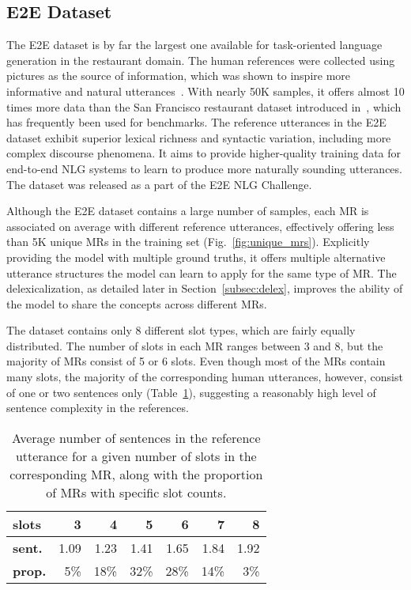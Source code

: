 \documentclass[11pt,a4paper]{article}
\begin{document}
\subsection{E2E Dataset}

The E2E dataset is by far the largest one available for task-oriented language generation in the restaurant domain. The human references were collected using pictures as the source of information, which was shown to inspire more informative and natural utterances~\cite{novikova2016crowd}. With nearly 50K samples, it offers almost 10 times more data than the San Francisco restaurant dataset introduced in~\citet{wen2015semantically}, which has frequently been used for benchmarks. The reference utterances in the E2E dataset exhibit superior lexical richness and syntactic variation, including more complex discourse phenomena. It aims to provide higher-quality training data for end-to-end NLG systems to learn to produce more naturally sounding utterances. The dataset was released as a part of the E2E NLG Challenge.

Although the E2E dataset contains a large number of samples, each MR is associated on average with  different reference utterances, effectively offering less than 5K unique MRs in the training set (Fig.~\ref{fig:unique_mrs}). Explicitly providing the model with multiple ground truths, it offers multiple alternative utterance structures the model can learn to apply for the same type of MR. The delexicalization, as detailed later in Section~\ref{subsec:delex}, improves the ability of the model to share the concepts across different MRs.

The dataset contains only 8 different slot types, which are fairly equally distributed. The number of slots in each MR ranges between 3 and 8, but the majority of MRs consist of 5 or 6 slots. Even though most of the MRs contain many slots, the majority of the corresponding human utterances, however, consist of one or two sentences only (Table~\ref{table:sentence_average}), suggesting a reasonably high level of sentence complexity in the references.

\begin{table}
  \small
  \centering
  \begin{tabular}{l r r r r r r}
    \toprule
    \textbf{slots}	& 3	& 4	& 5	& 6	& 7	& 8 \\
    \midrule
    \textbf{sent.}	& 1.09 & 1.23 & 1.41 & 1.65 & 1.84 & 1.92 \\
    \textbf{prop.}	& 5\% & 18\% & 32\% & 28\% & 14\% & 3\% \\
    \bottomrule
  \end{tabular}
  \caption{Average number of sentences in the reference utterance for a given number of slots in the corresponding MR, along with the proportion of MRs with specific slot counts.}
  \label{table:sentence_average}
\end{table}
\end{document}
